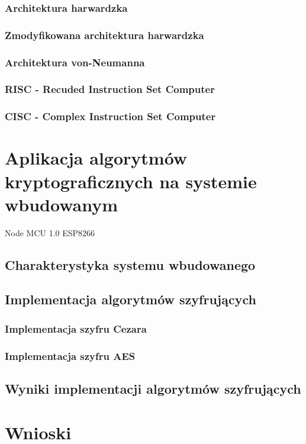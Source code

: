 \documentclass[12p]{article}
\begin{document}
\subsubsection{Architektura harwardzka}
\subsubsection{Zmodyfikowana architektura harwardzka}
\subsubsection{Architektura von-Neumanna}
\subsubsection{RISC - Recuded Instruction Set Computer}
\subsubsection{CISC - Complex Instruction Set Computer}

\newpage
\section{Aplikacja algorytmów kryptograficznych na systemie wbudowanym}
Node MCU 1.0 ESP8266
\subsection{Charakterystyka systemu wbudowanego}
\subsection{Implementacja algorytmów szyfrujących}
\subsubsection{Implementacja szyfru Cezara}
\subsubsection{Implementacja szyfru AES}
\subsection{Wyniki implementacji algorytmów szyfrujących} 
\newpage
\section{Wnioski}
\end{document}
